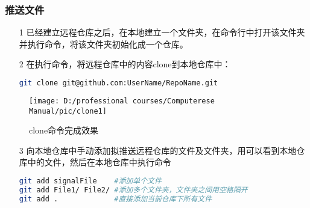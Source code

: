 \documentclass[cn, twoside]{myModel}
\begin{document}
		\subsubsection{推送文件}
			\begin{itemize}[leftmargin=12pt]
				\item[1]
				已经建立远程仓库之后，在本地建立一个文件夹，在命令行中打开该文件夹并执行命令，将该文件夹初始化成一个仓库。
			\end{itemize}
			\begin{itemize}[leftmargin=12pt]
				\item[2]
				在执行命令，将远程仓库中的内容clone到本地仓库中：
				\begin{lstlisting}[language=bash, numbers=none]
git clone git@github.com:UserName/RepoName.git
				\end{lstlisting}
			\end{itemize}
			\begin{figure}[H]
				\centering
				\texttt{[image: D:/professional courses/Computerese Manual/pic/clone1]}
				\caption{clone命令完成效果}
				\label{pic4}
			\end{figure}
			\begin{itemize}[leftmargin=12pt]
				\item[3]
				向本地仓库中手动添加拟推送远程仓库的文件及文件夹，用可以看到本地仓库中的文件，然后在本地仓库中执行命令
				\begin{lstlisting}[language=bash, numbers=none]
git add signalFile    #添加单个文件
git add File1/ File2/ #添加多个文件夹，文件夹之间用空格隔开
git add .             #直接添加当前仓库下所有文件
				\end{lstlisting}
			\end{itemize}
			
\end{document}
